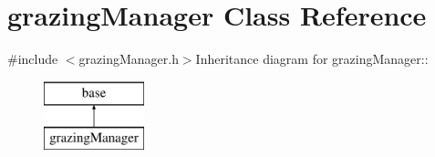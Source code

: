 \hypertarget{classgrazing_manager}{
\section{grazingManager Class Reference}
\label{classgrazing_manager}
}


{\ttfamily \#include $<$grazingManager.h$>$}Inheritance diagram for grazingManager::\begin{figure}[H]
\begin{center}
\leavevmode
\includegraphics[height=2cm]{classgrazing_manager}
\end{center}
\end{figure}
